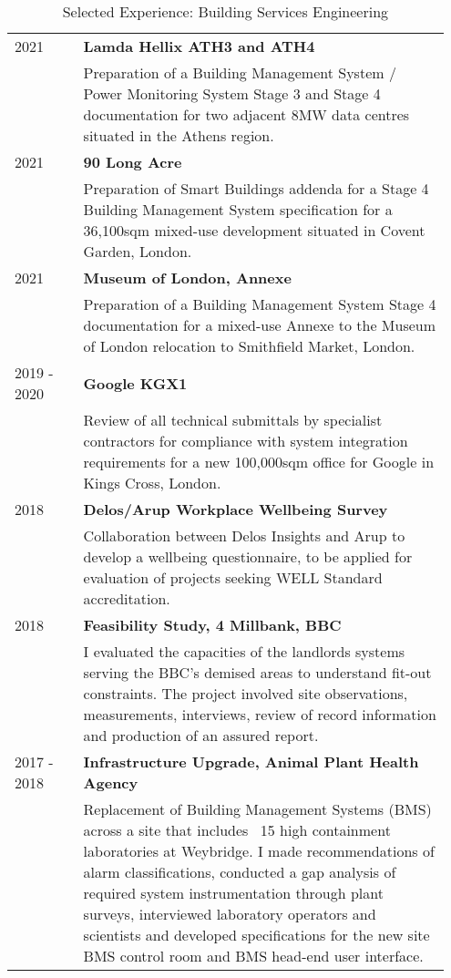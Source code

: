 \documentclass[11pt, oneside]{article}   	%
\begin{document}
\begin{table}[h]
\vspace{-5mm}
\caption*{Selected Experience: Building Services Engineering}
\vspace{-5mm}
\small
\begin{center}
\begin{tabular}{p{0.15\linewidth} p{0.8\linewidth}}
\hline
2021&\textbf{Lamda Hellix ATH3 and ATH4} \\
&Preparation of a Building Management System / Power Monitoring System Stage 3 and Stage 4 documentation for two adjacent 8MW data centres situated in the Athens region.\\
2021 &\textbf{90 Long Acre} \\
&Preparation of Smart Buildings addenda for a Stage 4 Building Management System specification for a 36,100sqm mixed-use development situated in Covent Garden, London.\\
2021&\textbf{Museum of London, Annexe} \\
&Preparation of a Building Management System Stage 4 documentation for a mixed-use Annexe to the Museum of London relocation to Smithfield Market, London.\\
2019 - 2020&\textbf{Google KGX1} \\
&Review of all technical submittals by specialist contractors for compliance with system integration requirements for a new 100,000sqm office for Google in Kings Cross, London.\\
2018&\textbf{Delos/Arup Workplace Wellbeing Survey} \\
&Collaboration between Delos Insights and Arup to develop a wellbeing questionnaire, to be applied for evaluation of projects seeking WELL Standard accreditation. \\
2018&\textbf{Feasibility Study, 4 Millbank, BBC} \\
&I evaluated the capacities of the landlords systems serving the BBC’s demised areas to understand fit-out constraints. The project involved site observations, measurements, interviews, review of record information and production of an assured report. \\
2017 - 2018&\textbf{Infrastructure Upgrade, Animal Plant Health Agency} \\
&Replacement of Building Management Systems (BMS) across a site that includes ~15 high containment laboratories at Weybridge. I made recommendations of alarm classifications, conducted a gap analysis of required system instrumentation through plant surveys, interviewed laboratory operators and scientists and developed specifications for the new site BMS control room and BMS head-end user interface. \\

\end{tabular}
\end{center}
\end{table}
\end{document}
